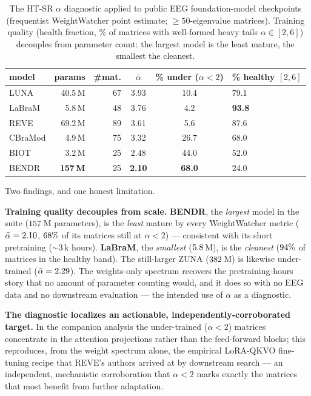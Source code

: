 \begin{table}[t]
\centering\small
\caption{The HT-SR $\alpha$ diagnostic applied to public EEG foundation-model checkpoints (frequentist
WeightWatcher point estimate; $\ge\!50$-eigenvalue matrices). Training quality (health fraction, \% of
matrices with well-formed heavy tails $\alpha\in[2,6]$) decouples from parameter count: the largest model
is the least mature, the smallest the cleanest.}
\begin{tabular}{lrrccl}
\toprule
model & params & \#mat. & $\bar\alpha$ & \% under ($\alpha{<}2$) & \% healthy $[2,6]$ \\
\midrule
LUNA    & 40.5\,M  & 67 & 3.93 & 10.4 & 79.1 \\
LaBraM  &  5.8\,M  & 48 & 3.76 &  4.2 & \textbf{93.8} \\
REVE    & 69.2\,M  & 89 & 3.61 &  5.6 & 87.6 \\
CBraMod &  4.9\,M  & 75 & 3.32 & 26.7 & 68.0 \\
BIOT    &  3.2\,M  & 25 & 2.48 & 44.0 & 52.0 \\
BENDR   & \textbf{157\,M} & 25 & \textbf{2.10} & \textbf{68.0} & 24.0 \\
\bottomrule
\end{tabular}
\label{tab:eegfm}
\end{table}

Two findings, and one honest limitation.

\textbf{Training quality decouples from scale.} \textbf{BENDR}, the \emph{largest} model in the suite
($157$\,M parameters), is the \emph{least} mature by every WeightWatcher metric ($\bar\alpha =
2.10$, $68\%$ of its matrices still at $\alpha<2$) --- consistent with its short
pretraining ($\sim$3\,k hours). \textbf{LaBraM}, the \emph{smallest} ($5.8$\,M), is the
\emph{cleanest} ($94\%$ of matrices in the healthy band). The still-larger ZUNA
($382$\,M) is likewise under-trained ($\bar\alpha=2.29$). The weights-only spectrum
recovers the pretraining-hours story that no amount of parameter counting would, and it does so with no
EEG data and no downstream evaluation --- the intended use of $\alpha$ as a diagnostic.

\textbf{The diagnostic localizes an actionable, independently-corroborated target.} In the companion
analysis the under-trained ($\alpha<2$) matrices concentrate in the attention projections rather than the
feed-forward blocks; this reproduces, from the weight spectrum alone, the empirical LoRA-QKVO fine-tuning
recipe that REVE's authors arrived at by downstream search --- an independent, mechanistic corroboration
that $\alpha<2$ marks exactly the matrices that most benefit from further adaptation.

